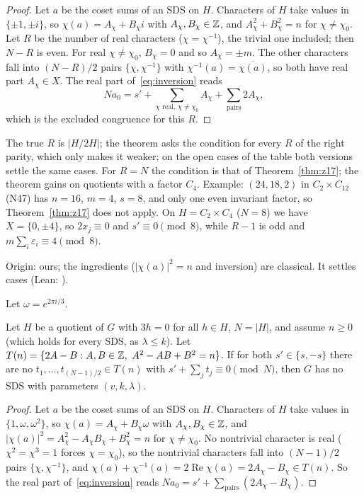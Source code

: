 \begin{proof}
Let $a$ be the coset sums of an SDS on $H$. Characters of $H$ take values in $\{\pm 1, \pm i\}$,
so $\chi(a) = A_\chi + B_\chi i$ with $A_\chi, B_\chi \in \mathbb{Z}$, and $A_\chi^2 + B_\chi^2 = n$ for
$\chi \ne \chi_0$. Let $R$ be the number of real characters ($\chi = \chi^{-1}$), the trivial one
included; then $N - R$ is even. For real $\chi \ne \chi_0$, $B_\chi = 0$ and so $A_\chi = \pm m$.
The other characters fall into $(N-R)/2$ pairs $\{\chi, \chi^{-1}\}$ with
$\chi^{-1}(a) = \overline{\chi(a)}$, so both have real part $A_\chi \in X$. The real part
of~\eqref{eq:inversion} reads
\[
  N a_0 = s' + \sum_{\chi \text{ real},\, \chi \ne \chi_0} A_\chi + \sum_{\text{pairs}} 2 A_\chi ,
\]
which is the excluded congruence for this $R$.
\end{proof}

\begin{remark}\label{rem:z18}
The true $R$ is $|H/2H|$; the theorem asks the condition for every $R$ of the right parity, which
only makes it weaker; on the open cases of the table both versions settle the same cases. For
$R = N$ the condition is that of Theorem~\ref{thm:z17}; the theorem gains on quotients with a
factor $C_4$. Example: $(24,18,2)$ in $C_2 \times C_{12}$ (N47) has $n = 16$,
$m = 4$, $s = 8$, and only one even invariant factor, so Theorem~\ref{thm:z17} does not apply.
On $H = C_2 \times C_4$ ($N = 8$) we have $X = \{0, \pm 4\}$, so $2x_j \equiv 0$ and
$s' \equiv 0 \pmod 8$, while $R - 1$ is odd and $m \sum_i \varepsilon_i \equiv 4 \pmod 8$.

Origin: ours; the ingredients ($|\chi(a)|^2 = n$ and inversion) are classical. It settles
 cases (Lean: ).
\end{remark}

Let $\omega = e^{2\pi i/3}$.

\begin{theorem}\label{thm:z19}
Let $H$ be a quotient of $G$ with $3h = 0$ for all $h \in H$, $N = |H|$, and assume $n \ge 0$
(which holds for every SDS, as $\lambda \le k$). Let
$T(n) = \{2A - B : A, B \in \mathbb{Z},\ A^2 - AB + B^2 = n\}$. If for both $s' \in \{s,-s\}$ there are
no $t_1, \dots, t_{(N-1)/2} \in T(n)$ with $s' + \sum_j t_j \equiv 0 \pmod N$, then $G$ has no
SDS with parameters $(v,k,\lambda)$.
\end{theorem}

\begin{proof}
Let $a$ be the coset sums of an SDS on $H$. Characters of $H$ take values in $\{1, \omega,
\omega^2\}$, so $\chi(a) = A_\chi + B_\chi \omega$ with $A_\chi, B_\chi \in \mathbb{Z}$, and
$|\chi(a)|^2 = A_\chi^2 - A_\chi B_\chi + B_\chi^2 = n$ for $\chi \ne \chi_0$. No nontrivial
character is real ($\chi^2 = \chi^3 = 1$ forces $\chi = \chi_0$), so the nontrivial characters
fall into $(N-1)/2$ pairs $\{\chi, \chi^{-1}\}$, and
$\chi(a) + \chi^{-1}(a) = 2\operatorname{Re}\chi(a) = 2A_\chi - B_\chi \in T(n)$. So the real
part of~\eqref{eq:inversion} reads $N a_0 = s' + \sum_{\text{pairs}} (2A_\chi - B_\chi)$.
\end{proof}

